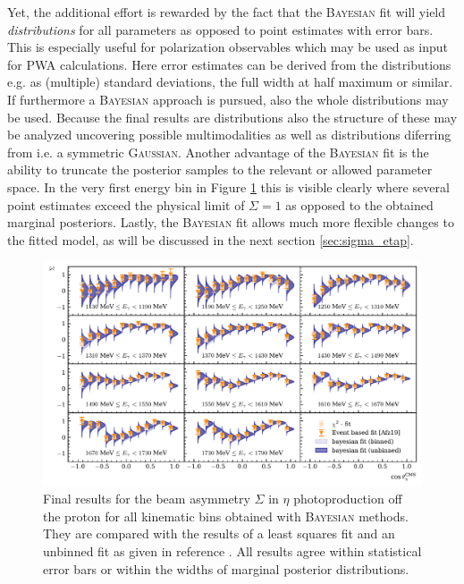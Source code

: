 Yet, the additional effort is rewarded by the fact that the \textsc{Bayesian} fit will yield \emph{distributions} for all parameters as opposed to point estimates with error bars. This is especially useful for polarization observables which may be used as input for PWA calculations. Here error estimates can be derived from the distributions e.g. as (multiple) standard deviations, the full width at half maximum or similar. If furthermore a \textsc{Bayesian} approach is  pursued, also the whole distributions may be used. Because the final results are distributions also the structure of these may be analyzed uncovering possible multimodalities as well as distributions diferring from i.e. a symmetric \textsc{Gaussian}. Another advantage of the \textsc{Bayesian} fit is the ability to truncate the posterior samples to the relevant or allowed parameter space. In the very first energy bin in Figure \ref{fig:eta_res} this is visible clearly where several point estimates exceed the physical limit of $\Sigma=1$ as opposed to the obtained marginal posteriors. Lastly, the \textsc{Bayesian} fit allows much more flexible changes to the fitted model, as will be discussed in the next section \ref{sec:sigma_etap}.
	\begin{figure}
		\centering
		\includegraphics[width=\linewidth]{../bayes/event_based_fit/plots/sigma_eta.pdf}
		\caption{Final results for the beam asymmetry $\Sigma$ in $\eta$ photoproduction off the proton for all kinematic bins obtained with \textsc{Bayesian} methods. They are compared with the results of a least squares fit and an unbinned fit as given in reference \cite{farahphd}. All results agree within statistical error bars or within the widths of marginal posterior distributions.}
		\label{fig:eta_res}
	\end{figure}

